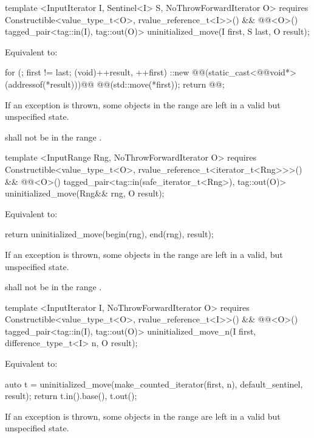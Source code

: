 {\color{addclr}
\begin{codeblock}
template <InputIterator I, Sentinel<I> S, NoThrowForwardIterator O>
  requires Constructible<value_type_t<O>, rvalue_reference_t<I>>() &&
           @@<O>()
    tagged_pair<tag::in(I), tag::out(O)> uninitialized_move(I first, S last, O result);
\end{codeblock}
} %

\setcounter{Paras}{0}
\pnum
\effects Equivalent to:
\begin{codeblock}
        for (; first != last; (void)++result, ++first)
          ::new @@(static_cast<@@void*>(addressof(*result)))@\added{)}@
            @@(std::move(*first));
        return @@;
\end{codeblock}

\pnum
\remarks If an exception is thrown, some objects in the range  are left in a valid but
unspecified state.

{\color{addclr}
\pnum
\requires {} shall not be in the range .

\begin{codeblock}
template <InputRange Rng, NoThrowForwardIterator O>
  requires Constructible<value_type_t<O>, rvalue_reference_t<iterator_t<Rng>>>() &&
           @@<O>()
    tagged_pair<tag::in(safe_iterator_t<Rng>), tag::out(O)>
    uninitialized_move(Rng&& rng, O result);
\end{codeblock}

\pnum
\effects Equivalent to:
\begin{codeblock}
        return uninitialized_move(begin(rng), end(rng), result);
\end{codeblock}

\pnum
\remarks If an exception is thrown, some objects in the range  are left in a valid, but
unspecified state.

\pnum
\requires {} shall not be in the range .

\begin{codeblock}
template <InputIterator I, NoThrowForwardIterator O>
  requires Constructible<value_type_t<O>, rvalue_reference_t<I>>() &&
           @@<O>()
    tagged_pair<tag::in(I), tag::out(O)>
    uninitialized_move_n(I first, difference_type_t<I> n, O result);
\end{codeblock}

\pnum
\effects Equivalent to:
\begin{codeblock}
        auto t = uninitialized_move(make_counted_iterator(first, n),
                                    default_sentinel{}, result);
        return {t.in().base(), t.out()};
\end{codeblock}

\pnum
} %
\remarks If an exception is thrown, some objects in the range 
are left in a valid\added{,} but unspecified state.

